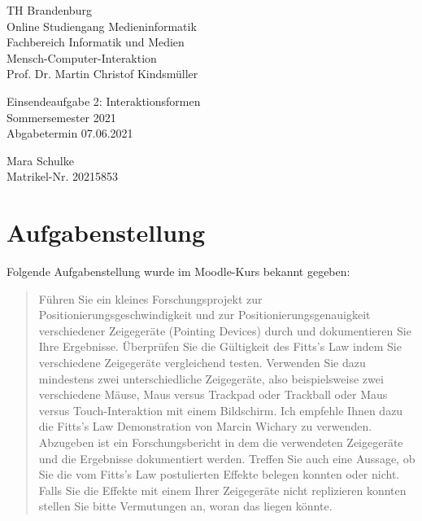 \documentclass{article}
\begin{document}
\begin{titlepage}
	\begin{flushleft}
		TH Brandenburg \\
		Online Studiengang Medieninformatik \\
		Fachbereich Informatik und Medien \\
		Mensch-Computer-Interaktion \\
		Prof. Dr. Martin Christof Kindsmüller
	\end{flushleft}

	\vfill

	\begin{center}
		\Large{Einsendeaufgabe 2: Interaktionsformen}\\[0.5em]
		\large{Sommersemester 2021}\\[0.25em]
		\large{Abgabetermin 07.06.2021}
	\end{center}

	\vfill

	\begin{flushright}
		Mara Schulke \\
		Matrikel-Nr. 20215853
	\end{flushright}
\end{titlepage}

\section{Aufgabenstellung}

Folgende Aufgabenstellung wurde im Moodle-Kurs bekannt gegeben:

\begin{quote}
	Führen Sie ein kleines Forschungsprojekt zur Positionierungsgeschwindigkeit
	und zur Positionierungsgenauigkeit verschiedener Zeigegeräte (Pointing
	Devices) durch und dokumentieren Sie Ihre Ergebnisse. Überprüfen Sie die
	Gültigkeit des Fitts's Law indem Sie verschiedene Zeigegeräte vergleichend
	testen. Verwenden Sie dazu mindestens zwei unterschiedliche Zeigegeräte,
	also beispielsweise zwei verschiedene Mäuse, Maus versus Trackpad oder
	Trackball oder Maus versus Touch-Interaktion mit einem Bildschirm. Ich
	empfehle Ihnen dazu die Fitts's Law Demonstration von Marcin Wichary zu
	verwenden. Abzugeben ist ein Forschungsbericht in dem die verwendeten
	Zeigegeräte und die Ergebnisse dokumentiert werden. Treffen Sie auch eine
	Aussage, ob Sie die vom Fitts's Law postulierten Effekte belegen konnten
	oder nicht. Falls Sie die Effekte mit einem Ihrer Zeigegeräte nicht
	replizieren konnten stellen Sie bitte Vermutungen an, woran das liegen
	könnte.
\end{quote}
\end{document}
